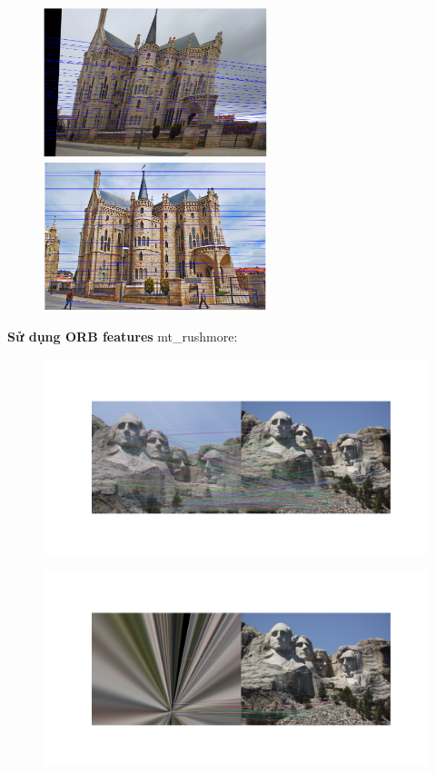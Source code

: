 \documentclass[11pt]{article}
\begin{document}
\begin{figure}[H]
    \centering
    \includegraphics[width=6.5cm]{images/part3/ransac_image_3_noise_0.2_left.png}
    \includegraphics[width=6.5cm]{images/part3/ransac_image_3_noise_0.2_right.png}
\end{figure}

\textbf{Sử dụng ORB features}
mt\_rushmore:
\begin{figure}[H]
    \centering
    \includegraphics[width=14cm]{images/part3/orb_image_1_0.png}
\end{figure}
\begin{figure}[H]
    \centering
    \includegraphics[width=14cm]{images/part3/orb_image_1_1.png}
\end{figure}
\end{document}
